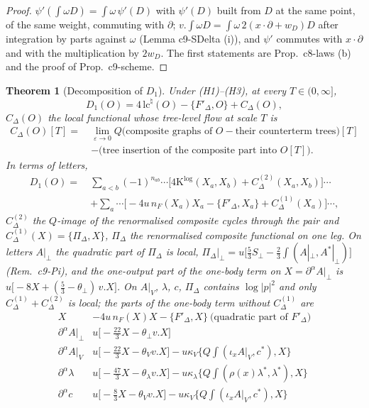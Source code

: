 \documentclass[11pt]{article}
\numberwithin{equation}{section}
\theoremstyle{plain}
\newtheorem{theorem}{Theorem}[section]
\theoremstyle{definition}
\begin{document}
\begin{proof}
$\psi'(\int\omega D)=\int\omega\,\psi'(D)$ with $\psi'(D)$ built from $D$ at the same point, of the same weight, commuting with $\partial$; $v.\int\omega D=\int\omega\,2(x\cdot\partial+w_D)D$ after integration by parts against $\omega$ (Lemma c9-SDelta (i)), and $\psi'$ commutes with $x\cdot\partial$ and with the multiplication by $2w_D$. The first statements are Prop.~c8-laws (b) and the proof of Prop.~c9-scheme.
\end{proof}

\begin{theorem}[Decomposition of $D_1$]
\label{thm:tl-D1}
Under (H1)--(H3), at every $T\in(0,\infty]$,
\begin{equation}
D_1(O)=4\,\mathrm{lc}^\natural(O)-\{F'_\Delta,O\}+C_\Delta(O),
\label{eq:tl-D1}
\end{equation}
$C_\Delta(O)$ the local functional whose tree-level flow at scale $T$ is
\[
\begin{aligned}C_\Delta(O)[T]=\ &\lim_{\varepsilon\to0}Q\Big(\text{composite graphs of }O-\text{their counterterm trees}\Big)[T]\\ &-\big(\text{tree insertion of the composite part into }O[T]\big).\end{aligned}
\]
In terms of letters,
\[
\begin{aligned}D_1(O)=\ &\sum_{a<b}(-1)^{n_{ab}}\cdots\Big[4\mathrm K^{\log}(X_a,X_b)+C^{(2)}_\Delta(X_a,X_b)\Big]\cdots\\ &+\sum_a\cdots\Big[-4u\,n_F(X_a)X_a-\{F'_\Delta,X_a\}+C^{(1)}_\Delta(X_a)\Big]\cdots,\end{aligned}
\]
$C^{(2)}_\Delta$ the $Q$-image of the renormalised composite cycles through the pair and $C^{(1)}_\Delta(X)=\{\Pi_\Delta,X\}$, $\Pi_\Delta$ the renormalised composite functional on one leg. On letters $A|_\perp$ the quadratic part of $\Pi_\Delta$ is local, $\Pi_\Delta|_\perp=u\big[\tfrac53S_\perp-\tfrac23\int(A|_\perp,A^*|_\perp)\big]$ (Rem.~c9-Pi), and the one-output part of the one-body term on $X=\partial^\alpha A|_\perp$ is $u\big[-8X+(\tfrac53-\theta_\perp)\,v.X\big]$. On $A|_V$, $\lambda$, $c$, $\Pi_\Delta$ contains $\log|p|^2$ and only $C^{(1)}_\Delta+C^{(2)}_\Delta$ is local; the parts of the one-body term without $C^{(1)}_\Delta$ are
\[
\begin{array}{l|c}
X & -4u\,n_F(X)X-\{F'_\Delta,X\}\ \text{(quadratic part of }F'_\Delta)\\\hline
\partial^\alpha A|_\perp & u\big[-\tfrac{22}3X-\theta_\perp v.X\big]\\
\partial^\alpha A|_V & u\big[-\tfrac{22}3X-\theta_V v.X\big]-u\kappa_V\{Q\int(\iota_xA|_V,c^*),X\}\\
\partial^\alpha\lambda & u\big[-\tfrac{47}3X-\theta_\lambda v.X\big]-u\kappa_\lambda\{Q\int(\rho(x)\lambda^*,\lambda^*),X\}\\
\partial^\alpha c & u\big[-\tfrac83X-\theta_V v.X\big]-u\kappa_V\{Q\int(\iota_xA|_V,c^*),X\}
\end{array}
\]
\end{theorem}
\end{document}
